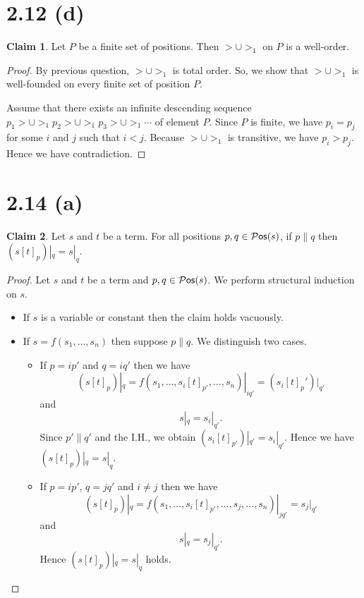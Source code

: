 \documentclass[autodetect-engine]{article}
\theoremstyle{plain}
\theoremstyle{definition}
\theoremstyle{definition}
\newtheorem*{claim}{Claim}
\begin{document}
\section*{2.12 (d)}

\begin{claim}
    Let $P$ be a finite set of positions.
    Then ${>} \cup {>_1}$ on $P$ is a well-order.
\end{claim}

\newcommand{\rr}{> \cup >_1}

\begin{proof}
    By previous question, $> \cup >_1$ is total order.
    So, we show that $> \cup >_1$ is well-founded on every finite set of position $P$.
    
    Assume that there exists an infinite descending sequence $p_1 \rr p_2 \rr p_3 \rr \cdots$ of element $P$.
    Since $P$ is finite, we have $p_i = p_j$ for some $i$ and $j$ such that $i < j$.
    Because $\rr$ is transitive, we have $p_i > p_j$.
    Hence we have contradiction.
\end{proof}

\section*{2.14 (a)}

\begin{claim}
    Let $s$ and $t$ be a term.
    For all positions $p,q \in \mathcal{P}\mathsf{os}(s)$, if $p \parallel q$ then $(s[t]_p)|_q = s|_q$. 
\end{claim}

\begin{proof}
    Let $s$ and $t$ be a term and $p,q \in \mathcal{P}\mathsf{os}(s)$.
    We perform structural induction on $s$.
    \begin{itemize}
        \item If $s$ is a variable or constant then the claim holds vacuously.
        \item If $s = f(s_1,\dots,s_n)$ then suppose $p \parallel q$.
        We distinguish two cases.
            \begin{itemize}
                \item If $p = ip'$ and $q = iq'$ then
                    we have
                        \[
                            (s[t]_p)|_q = f(s_1, \dots, s_i[t]_{p'}, \dots, s_n)|_{iq'} = (s_i[t]_p')|_{q'}
                        \]
                    and \[
                            s|_q = s_i|_{q'}.
                        \]
                    Since $p' \parallel q'$ and the I.H., we obtain $(s_i[t]_{p'})|_{q'} = s_i|_{q'}$.
                    Hence we have $(s[t]_p)|_q = s|_q$.
                \item If $p = ip'$, $q = jq'$ and $i \neq j$ then
                    we have
                    \[(s[t]_p)|_q = f(s_1, \dots, s_i[t]_{p'}, \dots, s_j, \dots, s_n)|_{jq'}
                    = s_j|_{q'}\]
                    and \[
                        s|_q = s_j|_{q'}.
                    \]
                    Hence $(s[t]_p)|_q = s|_q$ holds.
            \end{itemize}
    \end{itemize}
\end{proof}
\end{document}
